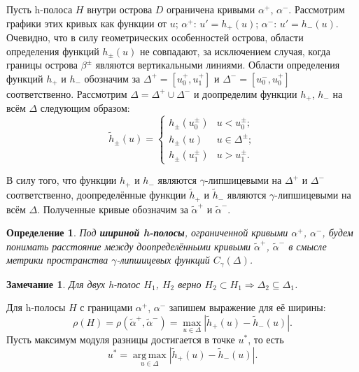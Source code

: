 \documentclass{article}
\newtheorem*{definition}{Определение}
\newtheorem{remark}{Замечание}
\DeclareMathOperator*{\argmax}{arg\,max}
\begin{document}
Пусть h-полоса $H$ внутри острова $D$ ограничена кривыми $\alpha^+$, $\alpha^-$.
Рассмотрим графики этих кривых как функции от $u$; $\alpha^+$: $u' = h_+(u)$; $\alpha^-$: $u' = h_-(u)$.
Очевидно, что в силу геометрических особенностей острова, области определения функций $h_{\pm}(u)$ не совпадают, за исключением случая, когда границы острова $\beta^{\pm}$ являются вертикальными линиями.
Области определения функций $h_+$ и $h_-$ обозначим за $\Delta^+ = [u_0^+, u_1^+]$ и $\Delta^- = [u_0^-, u_0^+]$ соответственно.
Рассмотрим $\Delta = \Delta^+ \cup \Delta^-$ и доопределим функции $h_+$, $h_-$ на всём $\Delta$ следующим образом:
\begin{equation}
	\widetilde{h}_{\pm}(u) = \begin{cases}
		h_{\pm}(u_0^{\pm}) & u < u_0^{\pm}; \\
		h_{\pm}(u) & u \in \Delta^{\pm}; \\
		h_{\pm}(u_1^{\pm}) & u > u_1^{\pm}.
	\end{cases}
\end{equation}

В силу того, что функции $h_+$ и $h_-$ являются $\gamma$-липшицевыми на $\Delta^+$ и $\Delta^-$ соответственно, доопределённые функции $\widetilde{h}_+$ и $\widetilde{h}_-$ являются $\gamma$-липшицевыми на всём $\Delta$.
Полученные кривые обозначим за $\widetilde{\alpha}^+$ и $\widetilde{\alpha}^-$.

\begin{definition}
	Под {\bf шириной h-полосы}, ограниченной кривыми $\alpha^+$, $\alpha^-$, будем понимать расстояние между доопределёнными кривыми $\widetilde{\alpha}^+$, $\widetilde{\alpha}^-$ в смысле метрики пространства $\gamma$-липшицевых функций $C_{\gamma}(\Delta)$.
\end{definition}

\begin{remark}
 	Для двух h-полос $H_1$, $H_2$ верно $H_2 \subset H_1 \Rightarrow \Delta_2 \subseteq \Delta_1$.
\label{rem:h-strips}
\end{remark}

Для h-полосы $H$ с границами $\alpha^+$, $\alpha^-$ запишем выражение для её ширины:
\begin{equation}
	\rho(H) = \rho(\widetilde{\alpha}^+, \widetilde{\alpha}^-) = \max \limits_{u \in \Delta} |\widetilde{h}_+(u) - \widetilde{h}_-(u)|.
\label{eq:width-h-strip}
\end{equation}
Пусть максимум модуля разницы достигается в точке $u^*$, то есть
\begin{equation}
	u^* = \argmax \limits_{u \in \Delta} |\widetilde{h}_+(u) - \widetilde{h}_-(u)|.
\label{eq:argmax}
\end{equation}
\end{document}
